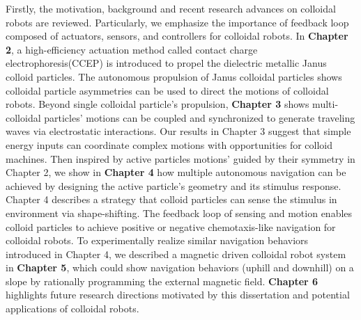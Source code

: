 \begin{titlepage}
Firstly, the motivation, background and recent research  advances on colloidal robots are reviewed. Particularly, we emphasize the importance of feedback
loop composed of actuators, sensors, and controllers for colloidal robots.  In \textbf{Chapter 2},  a high-efficiency actuation method called contact charge electrophoresis(CCEP) is introduced to propel the dielectric metallic Janus colloid particles.  The autonomous propulsion of Janus colloidal particles shows colloidal particle asymmetries can be used to direct the motions of colloidal robots. Beyond single colloidal particle's propulsion, \textbf{Chapter 3} shows multi-colloidal particles' motions can be coupled and synchronized to generate  traveling waves via electrostatic interactions.   Our results in Chapter 3 suggest that simple energy inputs can coordinate complex motions with opportunities for colloid machines.  Then inspired by active particles motions' guided by their symmetry in Chapter 2, we show in \textbf{Chapter 4} how multiple autonomous navigation can be achieved by designing the active particle's geometry and its stimulus response. Chapter 4 describes a strategy that colloid particles can sense the stimulus in environment via shape-shifting. The feedback loop of sensing and motion enables colloid particles to achieve positive or negative chemotaxis-like navigation for colloidal robots. To experimentally realize similar navigation behaviors introduced in Chapter 4,  we described a magnetic driven colloidal robot system in \textbf{Chapter 5}, which could show navigation behaviors (uphill and downhill) on a slope by rationally  programming the external magnetic field. \textbf{Chapter 6} highlights future research  directions motivated by this dissertation and potential applications of colloidal robots.

\vspace*{\fill}
\end{titlepage}
